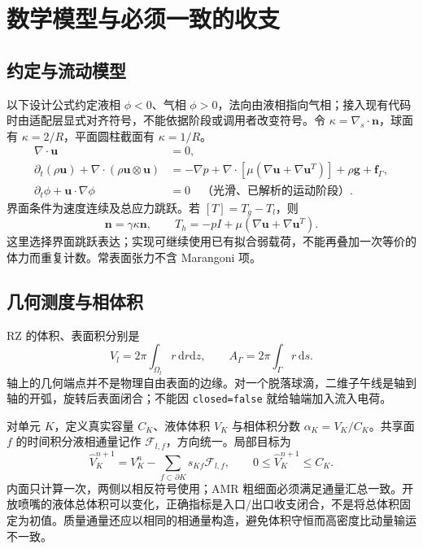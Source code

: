 \documentclass[11pt,a4paper]{article}
\newcommand{\dd}{\mathrm{d}}
\newcommand{\vct}[1]{\boldsymbol{#1}}
\newcommand{\code}[1]{{\small\nolinkurl{#1}}}
\begin{document}
\section{数学模型与必须一致的收支}
\subsection{约定与流动模型}
以下设计公式约定液相 $\phi<0$、气相 $\phi>0$，法向由液相指向气相；接入现有代码时由适配层显式对齐符号，不能依据阶段或调用者改变符号。令 $\kappa=\nabla_s\cdot\vct n$，球面有 $\kappa=2/R$，平面圆柱截面有 $\kappa=1/R$。
\begin{align}
\nabla\cdot\vct u&=0,\\
\partial_t(\rho\vct u)+\nabla\cdot(\rho\vct u\otimes\vct u)
&=-\nabla p+\nabla\cdot\left[\mu(\nabla\vct u+\nabla\vct u^T)\right]+\rho\vct g+\vct f_\Gamma,\\
\partial_t\phi+\vct u\cdot\nabla\phi&=0 \quad\text{（光滑、已解析的运动阶段）}.
\end{align}
界面条件为速度连续及总应力跳跃。若 $[T]=T_g-T_l$，则
\begin{equation}
[(T_h+T_e)]\vct n=\gamma\kappa\vct n,\qquad
T_h=-pI+\mu(\nabla\vct u+\nabla\vct u^T).
\end{equation}
这里选择界面跳跃表达；实现可继续使用已有拟合弱载荷，不能再叠加一次等价的体力而重复计数。常表面张力不含 Marangoni 项。

\subsection{几何测度与相体积}
RZ 的体积、表面积分别是
\begin{equation}
V_l=2\pi\int_{\Omega_l}r\,\dd r\dd z,\qquad
A_\Gamma=2\pi\int_\Gamma r\,\dd s.
\end{equation}
轴上的几何端点并不是物理自由表面的边缘。对一个脱落球滴，二维子午线是轴到轴的开弧，旋转后表面闭合；不能因 \code{closed=false} 就给轴端加入流入电荷。

对单元 $K$，定义真实容量 $C_K$、液体体积 $V_K$ 与相体积分数 $\alpha_K=V_K/C_K$。共享面 $f$ 的时间积分液相通量记作 $\mathcal F_{l,f}$，方向统一。局部目标为
\begin{equation}\label{eq:volume}
\widehat V_K^{n+1}=V_K^n-\sum_{f\subset\partial K}s_{Kf}\mathcal F_{l,f},\qquad
0\leq\widehat V_K^{n+1}\leq C_K.
\end{equation}
内面只计算一次，两侧以相反符号使用；AMR 粗细面必须满足通量汇总一致。开放喷嘴的液体总体积可以变化，正确指标是入口/出口收支闭合，不是将总体积固定为初值。质量通量还应以相同的相通量构造，避免体积守恒而高密度比动量输运不一致。
\end{document}
